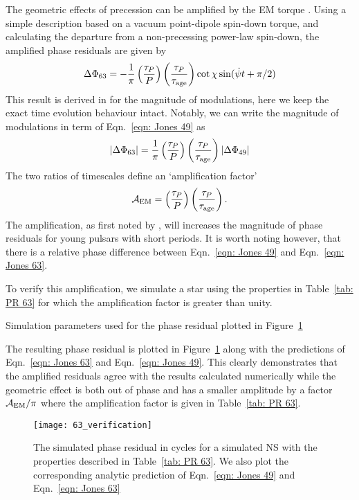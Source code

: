 \documentclass[../full_thesis/full_thesis.tex]{subfiles}
\begin{document}
The geometric effects of precession can be amplified by the EM torque \citep{Cordes1993}.
Using a simple description based on a vacuum point-dipole spin-down torque,
and calculating the departure from a non-precessing power-law spin-down,
the amplified phase residuals are given by
\begin{align}
\Delta\Phi_{63} = -\frac{1}{\pi}\left(\frac{\tau_{P}}{P}\right)
                               \left(\frac{\tau_{P}}{\tau_{\mathrm{age}}}\right)
                               \cot\chi
                               \sin(\dot{\psi} t + \pi/2)
\label{eqn: Jones 63}
\end{align}
This result is derived in \citet{Jones2001} for the magnitude of modulations, here
we keep the exact time evolution behaviour intact. Notably, we can write the
magnitude of modulations in term of Eqn.~\eqref{eqn: Jones 49} as
\begin{equation}
    |\Delta\Phi_{63}| = \frac{1}{\pi}\left(\frac{\tau_{P}}{P}\right)
    \left(\frac{\tau_{P}}{\tau_{\mathrm{age}}}\right)
                                    |\Delta\Phi_{49}|
\label{eqn: Jones 63 mag}
\end{equation}
The two ratios of timescales define an `amplification factor'
\begin{equation}
    \mathcal{A}_{\mathrm{EM}} = \left(\frac{\tau_{P}}{P}\right)
                                \left(\frac{\tau_{P}}{\tau_{\mathrm{age}}}\right).
\label{eqn: EM amplification}
\end{equation}
The amplification, as first noted by \citet{Cordes1993}, will increases the
magnitude of phase residuals for young pulsars with short periods. It is worth
noting however, that there is a relative phase difference between
Eqn.~\eqref{eqn: Jones 49} and Eqn.~\ref{eqn: Jones 63}.

To verify this amplification, we simulate a star using the properties in
Table~\ref{tab: PR 63} for which the amplification factor is greater than
unity.
\begin{table}[htb]
\centering

\caption{Simulation parameters used for the phase residual plotted in Figure~\ref{fig: PR 63}}
\label{tab: PR 63}
\end{table}
The resulting phase residual is plotted in Figure~\ref{fig: PR 63} along with the
predictions of Eqn.~\eqref{eqn: Jones 63} and Eqn.~\eqref{eqn: Jones 49}. This
clearly demonstrates that the amplified residuals agree with the results
calculated numerically while the geometric effect is both out of phase and
has a smaller amplitude by a factor $\mathcal{A}_{\mathrm{EM}}/\pi$ where the amplification factor is
given in Table~\ref{tab: PR 63}.
\begin{figure}[htb]
\centering
\texttt{[image: 63\_verification]}
\caption{The simulated phase residual in cycles for a simulated NS with the
properties described in Table~\ref{tab: PR 63}. We also plot the corresponding
analytic prediction of Eqn.~\eqref{eqn: Jones 49} and Eqn.~\eqref{eqn: Jones 63}}
\label{fig: PR 63}
\end{figure}
\end{document}
